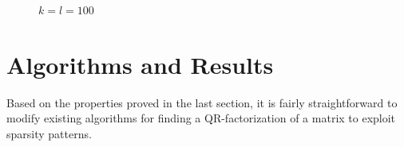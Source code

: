 \documentclass{article}
\numberwithin{pic}{section}
\numberwithin{lem}{section}
\numberwithin{thm}{section}
\numberwithin{cor}{section}
\theoremstyle{definition}
\numberwithin{ex}{section}
\numberwithin{defn}{section}
\theoremstyle{definition}
\theoremstyle{remark}
\begin{document}
\begin{figure}[H] 

    \caption{$k=l=100$ }
\end{figure} 
\section{Algorithms and Results}
Based on the properties proved in the last section, it is fairly straightforward
to modify existing algorithms for finding a QR-factorization of a matrix to
exploit sparsity patterns.
\end{document}
